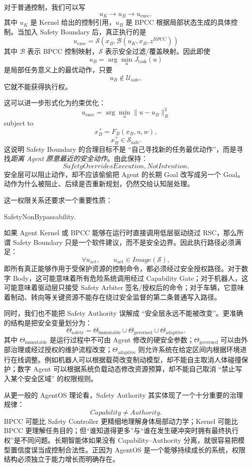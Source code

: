 对于普通控制，我们可以写
\[
u_K
\rightarrow
u_B
\rightarrow
u_{\mathrm{exec}},
\]
其中 $u_K$ 是 Kernel 给出的控制引用，$u_B$ 是 BPCC 根据局部状态生成的具体控制。当加入 Safety Boundary 后，真正执行的是
\[
\boxed{
u_{\mathrm{exec}}
=
\mathcal S
\left(
x_B,
\mathcal B
(
u_K,x_B,z^{BPCC}
)
\right)
}
\]
其中 $\mathcal B$ 表示 BPCC 控制映射，$\mathcal S$ 表示安全过滤/覆盖映射。因此即使
\[
u_B
=
\arg\min_u
J_{\mathrm{task}}(u)
\]
是局部任务意义上的最优动作，只要
\[
u_B\notin
\mathcal U_{\mathrm{safe}},
\]
它就不能获得执行权。

这可以进一步形式化为约束优化：
\[
u_{\mathrm{exec}}
=
\arg\min_u
\|u-u_B\|_R^2
\]
subject to
\[
x_B^{+}
=
F_B(x_B,u,w),
\]
\[
x_B^{+}
\in
\mathcal S_{\mathrm{safe}}.
\]
这说明 Safety Boundary 的合理目标不是 ``自己寻找新的任务最优动作''，而是寻找\emph{距离 Agent 原意最近的安全动作}。由此保持：
\[
\boxed{
SafetyOverridesExecution,
NotIntention.
}
\]
安全层可以阻止动作，却不应该偷偷把 Agent 的长期 Goal 改写成另一个 Goal。动作为什么被阻止、后续是否重新规划，仍然交给认知层处理。

这一权限关系还要求一个重要性质：
\begin{statementbox}
SafetyNonBypassability.
\end{statementbox}
如果 Agent Kernel 或 BPCC 能够在运行时直接调用低层驱动绕过 RSC，那么所谓 Safety Boundary 只是一个软件建议，而不是安全边界。因此执行路径必须满足：
\[
\forall u_{\mathrm{act}},
\qquad
u_{\mathrm{act}}
\in
Image(\mathcal S),
\]
即所有真正能够作用于受保护资源的控制命令，都必须经过安全授权路径。对于数字 Body，这可能意味着所有危险系统调用经过 Capability Gate；对于机器人，这可能意味着驱动层只接受 Safety Arbiter 签名/授权后的命令；对于车辆，它意味着制动、转向等关键资源不能存在绕过安全监督的第二条普通写入路径。

同时，我们也不能把 Safety Authority 误解成 ``安全层永远不能被改变''。更准确的结构是把安全变量划分为：
\[
\Theta_{\mathrm{safety}}
=
\Theta_{\mathrm{immutable}}
\cup
\Theta_{\mathrm{governed}}
\cup
\Theta_{\mathrm{adaptive}}.
\]
其中 $\Theta_{\mathrm{immutable}}$ 是运行过程中不可由 Agent 修改的硬安全参数；$\Theta_{\mathrm{governed}}$ 可以由外部治理或经过授权的维护流程改变；$\Theta_{\mathrm{adaptive}}$ 则允许系统在给定区间内根据环境进行在线调整。例如机器人可以根据载荷改变制动模型，却不能自主取消人体碰撞保护；数字 Agent 可以根据系统负载动态修改资源预算，却不能自己取消 ``禁止写入某个安全区域'' 的权限规则。

从更一般的 AgentOS 理论看，Safety Authority 其实体现了一个十分重要的治理规律：
\[
\boxed{
Capability
\neq
Authority.
}
\]
BPCC 可能比 Safety Controller 更精细地理解身体局部动力学；Kernel 可能比 BPCC 更理解任务目的；但``谁知道得更多''与``谁在发生硬冲突时拥有最终执行权''是不同问题。长期智能体如果没有 Capability--Authority 分离，就很容易把模型置信度误当成控制合法性。正因为 AgentOS 是一个能够持续成长的系统，权限结构必须独立于能力增长而明确存在。


